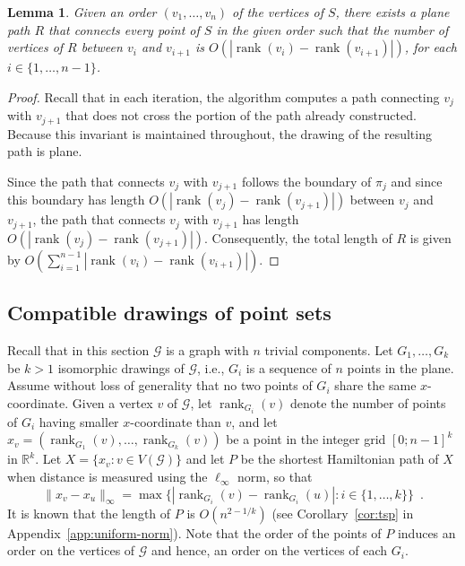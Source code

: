 \documentclass[11pt]{patmorin}
\newtheorem{lemma}[theorem]{Lemma}
\DeclareMathOperator{\rank}{rank}
\begin{document}
\begin{lemma}\label{lemma:Compatible augmentation for trivial components}
Given an order $(v_1, \ldots, v_n)$ of the vertices of $S$, there exists a plane path $R$ that connects every point of $S$ in the given order such that the number of vertices of $R$ between $v_{i}$ and $v_{i+1}$ is $O(|\rank(v_i) - \rank(v_{i+1})|)$, for each $i\in \{1,\dots,n-1\}$.
\end{lemma}
\begin{proof}
Recall that in each iteration, the algorithm computes a path connecting $v_j$ with $v_{j+1}$ that does not cross the portion of the path already constructed. Because this invariant is maintained throughout, the drawing of the resulting path is plane.

Since the path that connects $v_j$ with $v_{j+1}$ follows the boundary of $\pi_j$ and since this boundary has length $O(|\rank(v_j) - \rank(v_{j+1})|)$ between $v_j$ and $v_{j+1}$, the path that connects $v_j$ with $v_{j+1}$ has length $O(|\rank(v_j) - \rank(v_{j+1})|)$. Consequently,  the total length of $R$ is given by $O\left(\sum_{i=1}^{n-1} |\rank(v_i) - \rank(v_{i+1}) |\right)$.
\end{proof}



\subsection{Compatible drawings of point sets}

Recall that in this section $\mathcal G$ is a graph with $n$ trivial components.
Let $G_1, \ldots, G_k$ be $k>1$ isomorphic drawings of $\mathcal G$, i.e., $G_i$ is a sequence of $n$ points in the plane.
Assume without loss of generality that no two points of $G_i$ share the same $x$-coordinate.
Given a vertex $v$ of $\mathcal G$, let $\rank_{G_i}(v)$ denote the number of points of $G_i$ having smaller $x$-coordinate than $v$, and let $x_v = (\rank_{G_1}(v), \ldots, \rank_{G_k}(v))$ be a point in the integer grid $[0;n-1]^k$ in $\mathbb{R}^k$.  Let $X = \{x_v : v\in V(\mathcal G)\}$ and let $P$ be the shortest Hamiltonian path of $X$ when distance is measured using the $\ell_\infty$ norm, so that
\[
   \|x_v-x_u\|_\infty = \max\{|\rank_{G_i}(v)-\rank_{G_i}(u)|:i\in\{1,\ldots,k\}\} \enspace .
\]
It is known that the length of $P$ is $O(n^{2-1/k})$ (see
Corollary~\ref{cor:tsp} in Appendix~\ref{app:uniform-norm}).  Note that
the order of the points of $P$ induces an order on the vertices of
$\mathcal G$ and hence, an order on the vertices of each $G_i$.
\end{document}
